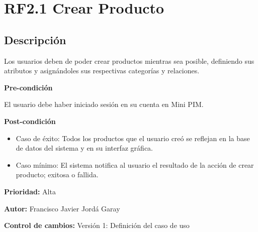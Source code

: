\documentclass[a4paper,12pt]{article}
\begin{document}
\section{RF2.1 Crear Producto}

\subsection*{Descripción}
Los usuarios deben de poder crear productos mientras sea posible, definiendo sus atributos y asignándoles sus respectivas categorías y relaciones.\par
\vspace{0.15cm}

\textbf{Pre-condición}\par
El usuario debe haber iniciado sesión en su cuenta en Mini PIM.\par
\vspace{0.15cm}

\textbf{Post-condición}
\begin{itemize}
    \item Caso de éxito: Todos los productos que el usuario creó se reflejan en la base de datos del sistema y en su interfaz gráfica.
    \item Caso mínimo: El sistema notifica al usuario el resultado de la acción de crear producto; exitosa o fallida.
\end{itemize}

\textbf{Prioridad: } Alta
\vspace{0.15cm}

\textbf{Autor: } Francisco Javier Jordá Garay\par
\vspace{0.15cm}

\textbf{Control de cambios: } Versión 1: Definición del caso de uso
\end{document}
